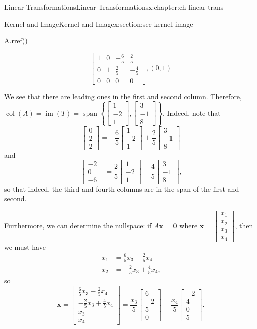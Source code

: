 \documentclass[oneside,10pt,]{book}
\numberwithin{equation}{section}
\newcommand{\spn}{\operatorname{span}}
\newcommand{\bbm}{\begin{bmatrix}}
\newcommand{\ebm}{\end{bmatrix}}
\newcommand{\im}{\operatorname{im}}
\newcommand{\csp}{\operatorname{col}}
\newcommand{\xx}{\mathbf{x}}
\newcommand{\amp}{&}
\begin{document}
\begin{chapterptx}{Linear Transformations}{}{Linear Transformations}{}{}{x:chapter:ch-linear-trans}
\begin{sectionptx}{Kernel and Image}{}{Kernel and Image}{}{}{x:section:sec-kernel-image}
\begin{sageinput}
A.rref()
\end{sageinput}
\begin{sageoutput}
\[\bbm 1\amp 0\amp -\frac65 \amp \frac25\\ 0\amp 1\amp \frac25 \amp -\frac45\\0\amp 0\amp 0\amp 0\ebm,(0,1)\]
\end{sageoutput}
We see that there are leading ones in the first and second column. Therefore, \(\csp(A) = \im(T) = \spn\left\{\bbm 1\\-2\\1\ebm, \bbm 3\\-1\\8\ebm\right\}\). Indeed, note that%
\begin{equation*}
\bbm 0\\2\\2\ebm = -\frac65\bbm 1\\-2\\1\ebm + \frac25\bbm 3\\-1\\8\ebm
\end{equation*}
and%
\begin{equation*}
\bbm -2\\0\\-6\ebm = \frac25\bbm 1\\-2\\1\ebm -\frac45\bbm 3\\-1\\8\ebm\text{,}
\end{equation*}
so that indeed, the third and fourth columns are in the span of the first and second.%
\par
Furthermore, we can determine the nullspace: if \(A\xx=\mathbf{0}\) where \(\xx=\bbm x_1\\x_2\\x_3\\x_4\ebm\), then we must have%
\begin{align*}
x_1 \amp =\frac65 x_3-\frac25 x_4\\
x_2 \amp =-\frac25 x_3+\frac 45 x_4\text{,}
\end{align*}
so%
\begin{equation*}
\xx = \bbm \frac65x_3-\frac25x_4\\ -\frac25x_3+\frac45x_4\\x_3\\x_4\ebm = \frac{x_3}{5}\bbm 6\\-2\\5\\0\ebm + \frac{x_4}{5}\bbm -2\\4\\0\\5\ebm\text{.}

\end{equation*}
\end{sectionptx}
\end{chapterptx}
\end{document}
